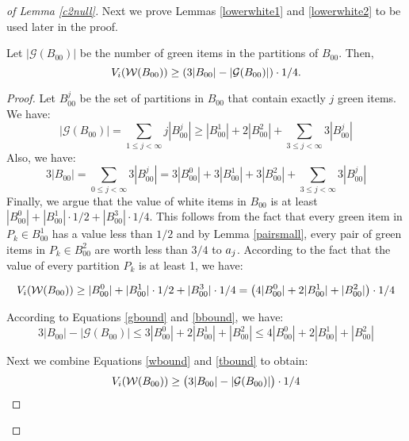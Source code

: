 \begin{proof}[of Lemma \ref{c2null}]
Next we prove Lemmas \ref{lowerwhite1} and \ref{lowerwhite2} to be used later in the proof. 
\begin{lemma}
\label{lowerwhite1}
Let $|{\mathcal{G}}(B_{00})|$ be the number of green items in the partitions of $B_{00}$. Then, $$V_i(\mathcal{W}(B_{00})) \geq (3|B_{00}| - |{\mathcal{G}}(B_{00})|)\cdot 1/4.$$
\end{lemma}
\begin{proof}
Let $B_{00}^j$ be the set of partitions in $B_{00}$ that contain exactly $j$ green items. We have:
\begin{equation}
\label{gbound}
|\mathcal{G}(B_{00})| = \sum_{1 \leq j < \infty} j  |B_{00}^j| \geq |B_{00}^1| + 2|B_{00}^2| + \sum_{3 \leq j < \infty} 3  |B_{00}^j| 
\end{equation}
Also, we have:
\begin{equation}
\label{bbound}
3 |B_{00}| = \sum_{0 \leq j < \infty} 3  |B_{00}^j| = 3  |B_{00}^0| + 3  |B_{00}^1| + 3  |B_{00}^2| + \sum_{3 \leq j < \infty} 3  |B_{00}^j|
\end{equation}
Finally, we argue that the value of white items in $B_{00}$ is at least $|B_{00}^0| + |B_{00}^1|\cdot 1/2 + |B_{00}^3|\cdot 1/4$. This follows from the fact that every green item in $P_k \in B_{00}^1$ has a value less than $1/2$ and by Lemma \ref{pairsmall}, every pair of green items in $P_k \in B_{00}^2$ are worth less than $3/4$ to $a_j$. According to the fact that the value of every partition $P_k$ is at least 1, we have:

\begin{equation}
\label{wbound}
V_i({\cal{W}}(B_{00})) \geq |B_{00}^0| + |B_{00}^1|\cdot 1/2 + |B_{00}^3|\cdot 1/4 = \big( 4|B_{00}^0| + 2|B_{00}^1| + |B_{00}^2| \big)\cdot 1/4
\end{equation}  

According to Equations \eqref{gbound} and \eqref{bbound}, we have:
\begin{equation}
\label{tbound}
3 |B_{00}| - |\mathcal{G}(B_{00})| \leq 3|B_{00}^0| + 2|B_{00}^1| + |B_{00}^2| \leq 4|B_{00}^0| + 2|B_{00}^1| + |B_{00}^2|
\end{equation}

Next we combine Equations \eqref{wbound} and \eqref{tbound} to obtain: 
\begin{equation}
V_i({\cal{W}}(B_{00})) \geq \big( 3 |B_{00}| - |\mathcal{G}(B_{00})| \big)\cdot 1/4
\end{equation}

\end{proof}




\end{proof}
